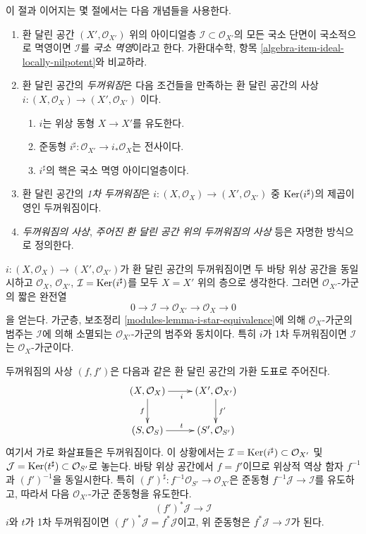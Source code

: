 \noindent
이 절과 이어지는 몇 절에서는 다음 개념들을 사용한다.
\begin{enumerate}
\item 환 달린 공간 $(X',\mathcal{O}_{X'})$ 위의 아이디얼층
$\mathcal{I}\subset\mathcal{O}_{X'}$의 모든 국소 단면이 국소적으로
멱영이면 $\mathcal{I}$를 {\it 국소 멱영}이라고 한다. 가환대수학,
항목 \ref{algebra-item-ideal-locally-nilpotent}와 비교하라.
\item 환 달린 공간의 {\it 두꺼워짐}은 다음 조건들을 만족하는
환 달린 공간의 사상
$i : (X, \mathcal{O}_X) \to (X', \mathcal{O}_{X'})$
이다.
\begin{enumerate}
\item $i$는 위상 동형 $X\to X'$를 유도한다.
\item 준동형 $i^\sharp:\mathcal{O}_{X'}\to i_*\mathcal{O}_X$는
전사이다.
\item $i^\sharp$의 핵은 국소 멱영 아이디얼층이다.
\end{enumerate}
\item 환 달린 공간의 {\it 1차 두꺼워짐}은
$i : (X, \mathcal{O}_X) \to (X', \mathcal{O}_{X'})$
중 $\mathop{\mathrm{Ker}}(i^\sharp)$의 제곱이 영인 두꺼워짐이다.
\item {\it 두꺼워짐의 사상}, {\it 주어진 환 달린 공간 위의
두꺼워짐의 사상} 등은 자명한 방식으로 정의한다.
\end{enumerate}
$i:(X,\mathcal{O}_X)\to(X',\mathcal{O}_{X'})$가 환 달린 공간의
두꺼워짐이면 두 바탕 위상 공간을 동일시하고 $\mathcal{O}_X$,
$\mathcal{O}_{X'}$, $\mathcal{I}=\mathop{\mathrm{Ker}}(i^\sharp)$를 모두 $X=X'$ 위의
층으로 생각한다. 그러면 $\mathcal{O}_{X'}$-가군의 짧은 완전열
$$
0 \to \mathcal{I} \to \mathcal{O}_{X'} \to \mathcal{O}_X \to 0
$$
을 얻는다. 가군층, 보조정리 \ref{modules-lemma-i-star-equivalence}에 의해
$\mathcal{O}_X$-가군의 범주는 $\mathcal{I}$에 의해 소멸되는
$\mathcal{O}_{X'}$-가군의 범주와 동치이다. 특히 $i$가 1차 두꺼워짐이면
$\mathcal{I}$는 $\mathcal{O}_X$-가군이다.

\begin{situation}
\label{situation-morphism-thickenings}
두꺼워짐의 사상 $(f,f')$은 다음과 같은 환 달린 공간의 가환 도표로
주어진다.
\begin{equation}
\label{equation-morphism-thickenings}
\vcenter{
\xymatrix{
(X, \mathcal{O}_X) \ar[r]_i \ar[d]_f & (X', \mathcal{O}_{X'}) \ar[d]^{f'} \\
(S, \mathcal{O}_S) \ar[r]^t & (S', \mathcal{O}_{S'})
}
}
\end{equation}
여기서 가로 화살표들은 두꺼워짐이다. 이 상황에서는
$\mathcal{I} = \mathop{\mathrm{Ker}}(i^\sharp) \subset \mathcal{O}_{X'}$ 및
$\mathcal{J} = \mathop{\mathrm{Ker}}(t^\sharp) \subset \mathcal{O}_{S'}$로 놓는다.
바탕 위상 공간에서 $f=f'$이므로 위상적 역상 함자 $f^{-1}$과
$(f')^{-1}$을 동일시한다. 특히
$(f')^\sharp:f^{-1}\mathcal{O}_{S'}\to\mathcal{O}_{X'}$은 준동형
$f^{-1}\mathcal{J}\to\mathcal{I}$를 유도하고, 따라서 다음
$\mathcal{O}_{X'}$-가군 준동형을 유도한다.
$$
(f')^*\mathcal{J} \longrightarrow \mathcal{I}
$$
$i$와 $t$가 1차 두꺼워짐이면 $(f')^*\mathcal{J}=f^*\mathcal{J}$이고,
위 준동형은 $f^*\mathcal{J}\to\mathcal{I}$가 된다.
\end{situation}

